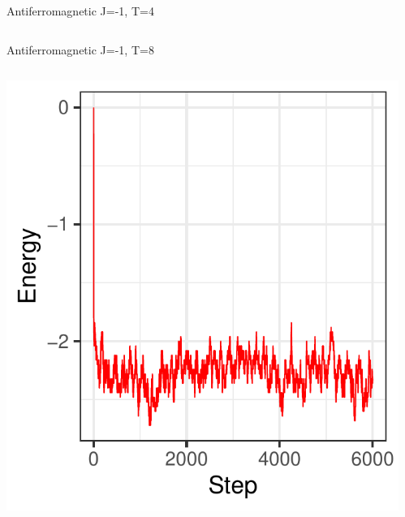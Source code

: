 \documentclass{beamer}
\begin{document}
\begin{frame}{Antiferromagnetic J=-1, T=4}
\begin{columns}
\begin{column}{0.5\textwidth}
\begin{center}
     \end{center}
\end{column}
\end{columns}
\end{frame}


\begin{frame}{Antiferromagnetic J=-1, T=8}
\begin{columns}
\begin{column}{0.5\textwidth}
    \begin{center}
     \includegraphics[width=\textwidth]{Pic/J-1_60_2500_T=8_ENERGY.pdf}
     \end{center}
\end{column}
\begin{column}{0.5\textwidth}
    \begin{center}

\end{center}
\end{column}
\end{columns}
\end{frame}
\end{document}
